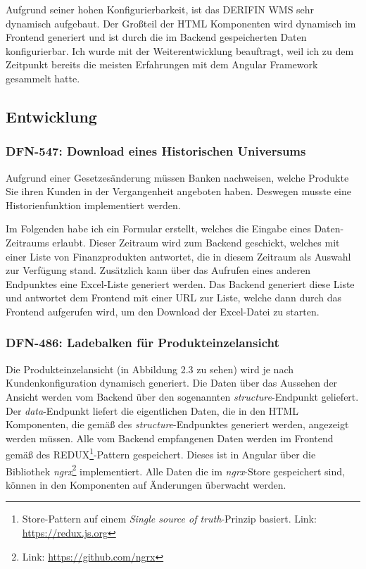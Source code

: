 \documentclass[chapterprefix=false, 12pt, a4paper, oneside, parskip=half, listof=totoc, bibliography=totoc, numbers=noendperiod]{scrbook}
\begin{document}
    Aufgrund seiner hohen Konfigurierbarkeit, ist das DERIFIN WMS sehr dynamisch aufgebaut. Der Großteil der HTML Komponenten
    wird dynamisch im Frontend generiert und ist durch die im Backend gespeicherten Daten konfigurierbar. Ich wurde mit
    der Weiterentwicklung beauftragt, weil ich zu dem Zeitpunkt bereits die meisten Erfahrungen mit dem Angular Framework gesammelt hatte.

    \subsection{Entwicklung}

    \subsubsection{DFN-547: Download eines Historischen Universums}

    Aufgrund einer Gesetzesänderung müssen Banken nachweisen, welche Produkte Sie ihren Kunden in der Vergangenheit
    angeboten haben. Deswegen musste eine Historienfunktion implementiert werden.

    Im Folgenden habe ich ein Formular erstellt, welches die Eingabe eines Daten-Zeitraums erlaubt. Dieser Zeitraum wird zum
    Backend geschickt, welches mit einer Liste von Finanzprodukten antwortet, die in diesem Zeitraum als Auswahl zur Verfügung
    stand. Zusätzlich kann über das Aufrufen eines anderen Endpunktes eine Excel-Liste generiert werden. Das Backend generiert
    diese Liste und antwortet dem Frontend mit einer URL zur Liste, welche dann durch das Frontend aufgerufen wird, um den
    Download der Excel-Datei zu starten.

    \subsubsection{DFN-486: Ladebalken für Produkteinzelansicht}

    Die Produkteinzelansicht (in Abbildung 2.3 zu sehen) wird je nach Kundenkonfiguration dynamisch generiert.
    Die Daten über das Aussehen der Ansicht werden vom Backend über den sogenannten \textit{structure}-Endpunkt geliefert.
    Der \textit{data}-Endpunkt liefert die eigentlichen Daten, die in den HTML Komponenten, die gemäß des \textit{structure}-Endpunktes
    generiert werden, angezeigt werden müssen. Alle vom Backend empfangenen Daten werden im Frontend gemäß des
    REDUX\footnote{Store-Pattern auf einem \textit{Single source of truth}-Prinzip basiert. Link: \url{https://redux.js.org}}-Pattern gespeichert.
    Dieses ist in Angular über die Bibliothek \textit{ngrx}\footnote{Link: \url{https://github.com/ngrx}} implementiert.
    Alle Daten die im \textit{ngrx}-Store gespeichert sind, können in den Komponenten auf Änderungen überwacht werden.
\end{document}
